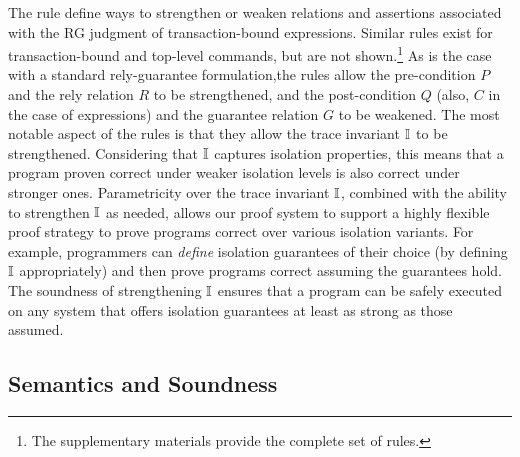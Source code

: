 
The  rule define ways to strengthen or
weaken relations and assertions associated with the RG judgment of
transaction-bound expressions. Similar rules exist for
transaction-bound and top-level commands, but are not
shown.\footnote{The supplementary materials provide the complete set
  of rules.} As is the case with a standard rely-guarantee
formulation,the rules allow the pre-condition $P$ and the rely relation
$R$ to be strengthened, and the post-condition $Q$ (also, $C$ in the
case of expressions) and the guarantee relation $G$ to be weakened.
The most notable aspect of the  rules is that
they allow the trace invariant $\mathbb{I}$ to be strengthened. Considering
that $\mathbb{I}$ captures isolation properties, this means that a program
proven correct under weaker isolation levels is also correct under
stronger ones.  Parametricity over the trace invariant $\mathbb{I}$, combined
with the ability to strengthen $\mathbb{I}$ as needed, allows our proof system
to support a highly flexible proof strategy to prove programs correct
over various isolation variants. For example, programmers can
\emph{define} isolation guarantees of their choice (by defining $\mathbb{I}$
appropriately) and then prove programs correct assuming the guarantees
hold.  The soundness of strengthening $\mathbb{I}$ ensures that a program can
be safely executed on any system that offers isolation guarantees
at least as strong as those assumed.

\subsection{Semantics and Soundness}

